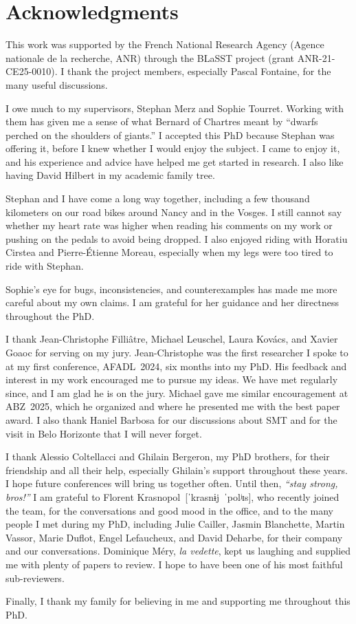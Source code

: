 \chapter*{Acknowledgments}

This work was supported by the French National Research Agency
(Agence nationale de la recherche, ANR) through the BLaSST project
(grant ANR-21-CE25-0010). I thank the project members, especially
Pascal Fontaine, for the many useful discussions.

I owe much to my supervisors, Stephan Merz and Sophie Tourret.
Working with them has given me a sense of what Bernard of Chartres meant
by ``dwarfs perched on the shoulders of giants.''
I accepted this PhD because Stephan was offering it, before I knew whether
I would enjoy the subject. I came to enjoy it, and his experience and advice
have helped me get started in research. I also like having David
Hilbert in my academic family tree.

Stephan and I have come a long way together, including a few thousand
kilometers on our road bikes around Nancy and in the Vosges. I still cannot
say whether my heart rate was higher when reading his comments on my work
or pushing on the pedals to avoid being dropped.
I also enjoyed riding with Horatiu Cirstea and Pierre-Étienne Moreau, especially when my legs
were too tired to ride with Stephan.

Sophie's eye for bugs, inconsistencies, and counterexamples has made me
more careful about my own claims. I am grateful for her guidance and
her directness throughout the PhD.

I thank Jean-Christophe Filliâtre, Michael Leuschel, Laura Kovács, and
Xavier Goaoc for serving on my jury. Jean-Christophe was the first researcher
I spoke to at my first conference, AFADL~2024, six months into my PhD.
His feedback and interest in my work encouraged me to pursue my ideas.
We have met regularly since, and I am glad he is on the jury.
Michael gave me similar encouragement at ABZ~2025, which he organized
and where he presented me with the best paper award.
I also thank Haniel Barbosa for our discussions about SMT and for the visit in
Belo Horizonte that I will never forget.

\ifThesisAfive{}\fi
I thank Alessio Coltellacci and Ghilain Bergeron, my PhD brothers, for their friendship and all
their help, especially Ghilain's support throughout these years.
I hope future conferences will bring us together often. Until then, \emph{``stay strong, bros!''}
I am grateful to Florent Krasnopol~\mbox{[ˈkrasnɨj ˈpolʲɪs]}, who recently joined
the team, for the conversations and good mood in the office, and to the many people I met during my PhD, including
Julie Cailler, Jasmin Blanchette, Martin Vassor, Marie Duflot, Engel Lefaucheux, and David Deharbe,
for their company and our conversations.
Dominique Méry, \emph{la vedette}, kept us laughing and supplied me with
plenty of papers to review. I hope to have been one of his most faithful sub-reviewers.

Finally, I thank my family for believing in me and supporting me throughout
this PhD.
